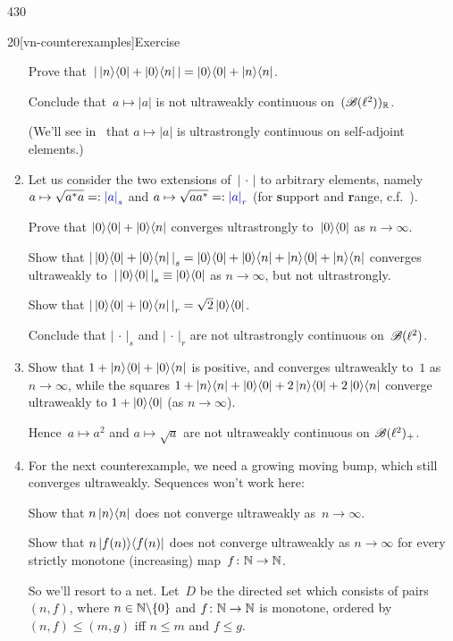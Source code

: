 \begin{parsec}{430}
\begin{point}{20}[vn-counterexamples]{Exercise}
\begin{enumerate}
Prove that~$\left|\, \left|n\right>\!\left<0\right|+\left|0\right>\!\left<n\right|\,\right|
= \left|0\right>\!\left<0\right|+\left|n\right>\!\left<n\right|$.

Conclude that~$a\mapsto \left|a\right|$
is not ultraweakly continuous on~$(\mathscr{B}(\ell^2))_{\mathbb{R}}$.

(We'll see in~ that $a\mapsto \left|a\right|$
is ultrastrongly continuous on self-adjoint elements.)

\item
Let us consider the two extensions of~$\left|\,\cdot\,\right|$
to arbitrary elements, namely
$a\mapsto \sqrt{a^*a}=:\Define{\left|a\right|_s}$ and 
$a\mapsto \sqrt{aa^*}=:\Define{\left|a\right|_r}$
(for \textbf{s}upport and \textbf{r}ange,
c.f.~).

Prove that $\left|0\right>\!\left<0\right| + \left|0\right>\!\left<n\right|$
converges ultrastrongly to~$\left|0\right>\!\left<0\right|$ as $n\to \infty$.

Show that $\left|\,\left|0\right>\!\left<0\right|+\left|0\right>\!\left<n\right|\,\right|_s
= \left|0\right>\!\left<0\right|
+\left|0\right>\!\left<n\right|
+\left|n\right>\!\left<0\right|
+\left|n\right>\!\left<n\right|$
converges ultraweakly to~$\left|\,\left|0\right>\!\left<0\right|\,\right|_s
\equiv \left|0\right>\!\left<0\right|$
as $n\to \infty$,
but not ultrastrongly.

Show that $\left|\,\left|0\right>\!\left<0\right|+\left|0\right>\!\left<n\right|\,\right|_r
= \sqrt{2} \left|0\right>\!\left<0\right|$.

Conclude that $\left|\,\cdot\,\right|_s$
and $\left|\,\cdot\,\right|_r$
are not ultrastrongly continuous on~$\mathscr{B}(\ell^2)$.

\item
Show that $1+\left|n\right>\!\left<0\right|+\left|0\right>\!\left<n\right|$
is positive,
and 
converges ultraweakly to~$1$ as~$n\to\infty$,
while the squares
$1+\left|n\right>\!\left<n\right|+\left|0\right>\!\left<0\right|+2\left|n\right>\!\left<0\right|+2\left|0\right>\!\left<n\right|$
converge ultraweakly to $1+\left|0\right>\!\left<0\right|$
(as $n\to\infty$).

Hence~$a\mapsto a^2$
and $a\mapsto \sqrt{a}$
are not ultraweakly continuous on $\mathscr{B}(\ell^2)_{+}$.

\item
\label{vn-counterexamples-9}
For the next counterexample,
we need a growing moving bump,
which still converges ultraweakly.
Sequences won't work here:

Show that $n\left|n\right>\!\left<n\right|$ does not converge ultraweakly as~$n\to\infty$.

Show that $n \left|f(n)\right>\!\left<f(n)\right|$ does not converge ultraweakly
as $n\to\infty$
for every strictly monotone (increasing) map~$f\colon \mathbb{N}\to\mathbb{N}$.

So we'll resort to a net.
Let~$D$ be the directed set which consists of pairs $(n,f)$,
where $n\in \mathbb{N}\backslash\{0\}$ and $f\colon \mathbb{N}\to\mathbb{N}$
is monotone, ordered by $(n,f)\leq (m,g)$ iff $n\leq m$ and $f\leq g$.


\end{enumerate}
\end{point}
\end{parsec}
